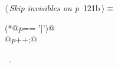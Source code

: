 \documentclass[a4paper]{report}
\begin{document}
\begin{flushleft} \small
\begin{minipage}{\linewidth}\label{scrap260}\raggedright\small
{} $\langle\,${\it Skip invisibles on \hbox{\slshape\sffamily p\/}}\nobreak\ {\footnotesize {121b}}$\,\rangle\equiv$
\vspace{-1ex}
\begin{list}{}{} \item
\mbox{}\verb@if (*@\hbox{\slshape\sffamily p\/}\verb@ == '|')@\\
\mbox{}\verb@   @\hbox{\slshape\sffamily p\/}\verb@++;@\\
\mbox{}\verb@@{\NWsep}
\end{list}
\vspace{-1.5ex}
\footnotesize
\begin{list}{}{\setlength{\itemsep}{-\parsep}\setlength{\itemindent}{-\leftmargin}}
\item \NWtxtMacroRefIn\ .

\item{}
\end{list}
\end{minipage}\vspace{4ex}
\end{flushleft}
\end{document}
